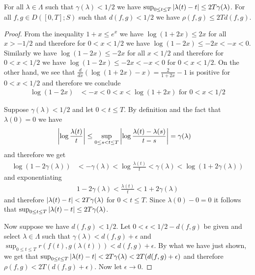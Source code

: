 \begin{lem}\label{SkorohodEquivalenceA}For all $\lambda \in \Lambda$ such that $\gamma(\lambda) < 1/2$ we have
  $\sup_{0 \leq t \leq T} \left \vert \lambda(t) - t \right \vert \leq
  2T\gamma(\lambda)$.  For all $f,g \in D([0,T]; S)$ such that $d(f,g) < 1/2$ we
  have $\rho(f,g) \leq 2Td(f,g)$.
\end{lem}
\begin{proof}
From the inequality $1+x \leq e^x$ we have
$\log(1+2x) \leq 2x$ for all $x > -1/2$ and therefore for $0 < x <
1/2$ we have $\log(1-2x) \leq -2x < -x < 0$.  
Similarly we have
$\log(1-2x) \leq -2x$ for all $x < 1/2$ and therefore for $0 < x <
1/2$ we have $\log(1-2x) \leq -2x < -x < 0$ for $0 < x < 1/2$.  On the
other hand, we see that $\frac{d}{dx} \left ( \log(1+2x) - x \right) =
\frac{2}{1+2x} - 1$ is positive for $0 < x < 1/2$ and therefore we
conclude 
\begin{align*}
\log(1-2x) &< -x < 0 < x < \log(1+2x) \text{ for } 0 < x < 1/2
\end{align*}

Suppose $\gamma(\lambda) < 1/2$ and let $0 < t \leq T$.  By definition and the
fact that $\lambda(0) = 0$ we have
\begin{align*}
\left \vert \log \frac{\lambda(t)}{t} \right \vert &\leq \sup_{0 \leq s < t \leq
  T}\left \vert \log \frac{\lambda(t) - \lambda(s)}{t-s} \right \vert = \gamma(\lambda) 
\end{align*}
and therefore we get
\begin{align*}
\log(1-2\gamma(\lambda)) &< -\gamma(\lambda) < \log \frac{\lambda(t)}{t} < \gamma(\lambda) < \log(1+2\gamma(\lambda))
\end{align*}
and exponentiating
\begin{align*}
1 - 2\gamma(\lambda) < \frac{\lambda(t)}{t} < 1 + 2 \gamma(\lambda)
\end{align*}
and therefore $\left \vert \lambda(t) - t \right \vert < 2 T \gamma(\lambda)$ for $0 < t \leq T$.  Since $\lambda(0) - 0 = 0$ 
it follows that $\sup_{0 \leq t \leq T} \left \vert \lambda(t) - t \right \vert \leq 2 T \gamma(\lambda)$.

Now suppose we have $d(f,g) < 1/2$.  Let $0 < \epsilon < 1/2 - d(f,g)$ be given and
select $\lambda \in \Lambda$ such that $\gamma(\lambda) <
d(f,g) + \epsilon$ and $\sup_{0 \leq t \leq T} r(f(t),
g(\lambda(t))) < d(f,g) + \epsilon$.  By what we have just shown, we
get that $\sup_{0 \leq t \leq T} \left \vert \lambda(t) - t \right \vert < 2 T
\gamma(\lambda) < 2T(d(f,g) + \epsilon)$ and therefore $\rho(f,g) <
2T(d(f,g) + \epsilon)$.  Now let $\epsilon \to 0$.
\end{proof}


